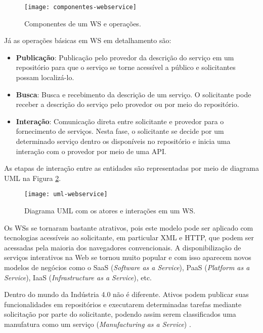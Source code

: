 	\begin{figure}[hbt!]
		\centering
		\caption{Componentes de um WS e operações.}
		\texttt{[image: componentes-webservice]}
		\label{fig:componentes-webservice}
	\end{figure}
	
	Já as operações básicas em WS em detalhamento são:
	
	\begin{itemize}
		\item \textbf{Publicação}: Publicação pelo provedor da descrição do serviço em um repositório para que o serviço se torne acessível a público e solicitantes possam localizá-lo. 
		\item \textbf{Busca}: Busca e recebimento da descrição de um serviço. O solicitante pode receber a descrição do serviço pelo provedor ou por meio do repositório.
		\item \textbf{Interação}: Comunicação direta entre solicitante e provedor para o fornecimento de serviços. Nesta fase, o solicitante se decide por um determinado serviço dentro os disponíveis no repositório e inicia uma interação com o provedor por meio de uma API.
	\end{itemize}
	
	As etapas de interação entre as entidades são representadas por meio de diagrama UML na Figura \ref{fig:uml-webservice}.
	
	\begin{figure}[hbt!]
		\centering
		\caption{Diagrama UML com os atores e interações em um WS.}
		\texttt{[image: uml-webservice]}
		\label{fig:uml-webservice}
	\end{figure}

	Os WSs se tornaram bastante atrativos, pois este modelo pode ser aplicado com tecnologias acessíveis ao solicitante, em particular XML e HTTP, que podem ser acessadas pela maioria dos navegadores convencionais. A disponibilização de serviços interativos na Web se tornou muito popular e com isso aparecem novos modelos de negócios como o SaaS (\textit{Software as a Service}), PaaS (\textit{Platform as a Service}), IaaS (\textit{Infrastructure as a Service}), etc.
	
	Dentro do mundo da Indústria 4.0 não é diferente. Ativos podem publicar suas funcionalidades em repositórios e executarem determinadas tarefas mediante solicitação por parte do solicitante, podendo assim serem classificados uma manufatura como um serviço (\textit{Manufacturing as a Service}) \cite{annunziata2019maas, nichols2020maas, siepen2019maas}.
	
